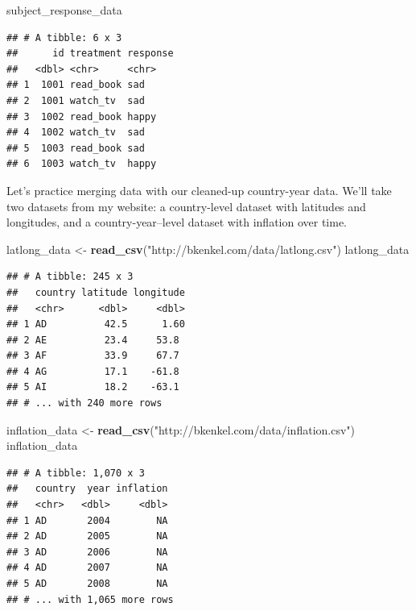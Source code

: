 \documentclass[
  12pt,
  oneside,openany]{book}
\newenvironment{Shaded}{\begin{snugshade}}{\end{snugshade}}
\newcommand{\KeywordTok}[1]{\textcolor[rgb]{0.13,0.29,0.53}{\textbf{#1}}}
\newcommand{\NormalTok}[1]{#1}
\newcommand{\StringTok}[1]{\textcolor[rgb]{0.31,0.60,0.02}{#1}}
\begin{document}
\begin{Shaded}
\begin{Highlighting}[]
\NormalTok{subject\_response\_data}
\end{Highlighting}
\end{Shaded}

\begin{verbatim}
## # A tibble: 6 x 3
##      id treatment response
##   <dbl> <chr>     <chr>   
## 1  1001 read_book sad     
## 2  1001 watch_tv  sad     
## 3  1002 read_book happy   
## 4  1002 watch_tv  sad     
## 5  1003 read_book sad     
## 6  1003 watch_tv  happy
\end{verbatim}

Let's practice merging data with our cleaned-up country-year data. We'll take two datasets from my website: a country-level dataset with latitudes and longitudes, and a country-year--level dataset with inflation over time.

\begin{Shaded}
\begin{Highlighting}[]
\NormalTok{latlong\_data <{-}}\StringTok{ }\KeywordTok{read\_csv}\NormalTok{(}\StringTok{"http://bkenkel.com/data/latlong.csv"}\NormalTok{)}
\NormalTok{latlong\_data}
\end{Highlighting}
\end{Shaded}

\begin{verbatim}
## # A tibble: 245 x 3
##   country latitude longitude
##   <chr>      <dbl>     <dbl>
## 1 AD          42.5      1.60
## 2 AE          23.4     53.8 
## 3 AF          33.9     67.7 
## 4 AG          17.1    -61.8 
## 5 AI          18.2    -63.1 
## # ... with 240 more rows
\end{verbatim}

\begin{Shaded}
\begin{Highlighting}[]
\NormalTok{inflation\_data <{-}}\StringTok{ }\KeywordTok{read\_csv}\NormalTok{(}\StringTok{"http://bkenkel.com/data/inflation.csv"}\NormalTok{)}
\NormalTok{inflation\_data}
\end{Highlighting}
\end{Shaded}

\begin{verbatim}
## # A tibble: 1,070 x 3
##   country  year inflation
##   <chr>   <dbl>     <dbl>
## 1 AD       2004        NA
## 2 AD       2005        NA
## 3 AD       2006        NA
## 4 AD       2007        NA
## 5 AD       2008        NA
## # ... with 1,065 more rows
\end{verbatim}
\end{document}
